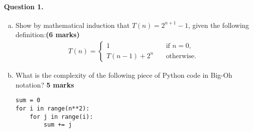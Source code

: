 \documentclass[12pt]{article}
\begin{document}
\paragraph{Question 1.}
\begin{enumerate}[(a)]
    \item Show by mathematical induction that $T(n)=2^{n+1}-1$, given the following definition:\hfill{\bf (6 marks)}\\
    \begin{align*}
    T(n)=\left\{
                    \begin{array}{ll}
                      1&\quad \text{if }n=0,\\
                      T(n-1)+2^n&\quad\text{otherwise.}
                    \end{array}
                  \right.
    \end{align*}
    \item What is the complexity of the following piece of Python code in Big-Oh notation? \hfill {\bf 5 marks}
    \begin{verbatim}
sum = 0
for i in range(n**2):
    for j in range(i):
        sum += j
    \end{verbatim}
\end{enumerate}
\end{document}
